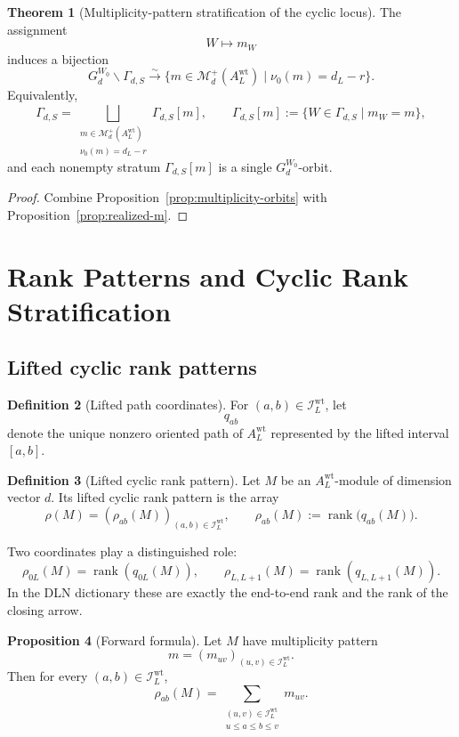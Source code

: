 \documentclass[11pt]{article}
\newcommand{\rk}{\operatorname{rank}}
\theoremstyle{definition}
\newtheorem{theorem}{Theorem}[section]
\newtheorem{proposition}[theorem]{Proposition}
\newtheorem{definition}[theorem]{Definition}
\begin{document}
\begin{theorem}[Multiplicity-pattern stratification of the cyclic locus]
\label{thm:multiplicity-stratification}
The assignment
\[
W\longmapsto m_W
\]
induces a bijection
\[
G_d^{W_0}\backslash \Gamma_{d,S}
\xrightarrow{\sim}
\{m\in \mathcal M_d^+(A_L^{\mathrm{wt}})\mid \nu_0(m)=d_L-r\}.
\]
Equivalently,
\[
\Gamma_{d,S}
=
\bigsqcup_{\substack{m\in \mathcal M_d^+(A_L^{\mathrm{wt}})\\ \nu_0(m)=d_L-r}}
\Gamma_{d,S}[m],
\qquad
\Gamma_{d,S}[m]:=\{W\in \Gamma_{d,S}\mid m_W=m\},
\]
and each nonempty stratum \(\Gamma_{d,S}[m]\) is a single \(G_d^{W_0}\)-orbit.
\end{theorem}

\begin{proof}
Combine Proposition~\ref{prop:multiplicity-orbits} with
Proposition~\ref{prop:realized-m}.
\end{proof}

\section{Rank Patterns and Cyclic Rank Stratification}

\subsection{Lifted cyclic rank patterns}

\begin{definition}[Lifted path coordinates]
For \((a,b)\in \mathcal I_L^{\mathrm{wt}}\), let
\[
q_{ab}
\]
denote the unique nonzero oriented path of \(A_L^{\mathrm{wt}}\) represented by
the lifted interval \([a,b]\).
\end{definition}

\begin{definition}[Lifted cyclic rank pattern]
Let \(M\) be an \(A_L^{\mathrm{wt}}\)-module of dimension vector \(d\). Its
lifted cyclic rank pattern is the array
\[
\rho(M)=(\rho_{ab}(M))_{(a,b)\in \mathcal I_L^{\mathrm{wt}}},
\qquad
\rho_{ab}(M):=\rk\bigl(q_{ab}(M)\bigr).
\]
\end{definition}

Two coordinates play a distinguished role:
\[
\rho_{0L}(M)=\rk(q_{0L}(M)),
\qquad
\rho_{L,L+1}(M)=\rk(q_{L,L+1}(M)).
\]
In the DLN dictionary these are exactly the end-to-end rank and the rank of the
closing arrow.

\begin{proposition}[Forward formula]
\label{prop:forward}
Let \(M\) have multiplicity pattern
\[
m=(m_{uv})_{(u,v)\in \mathcal I_L^{\mathrm{wt}}}.
\]
Then for every \((a,b)\in \mathcal I_L^{\mathrm{wt}}\),
\[
\rho_{ab}(M)
=
\sum_{\substack{(u,v)\in \mathcal I_L^{\mathrm{wt}}\\ u\leq a\leq b\leq v}}
m_{uv}.
\]
\end{proposition}
\end{document}
